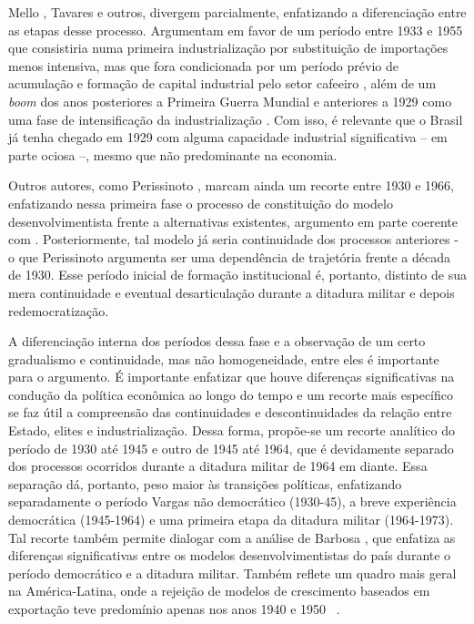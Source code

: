 Mello \citeyearpar{mello1982}, Tavares \citeyearpar{tavares1973} e outros,
divergem parcialmente, enfatizando a diferenciação entre as
etapas desse processo. Argumentam em favor de um período entre 1933 e 1955 que
consistiria numa primeira industrialização por substituição de
importações menos intensiva, mas que fora condicionada por um período
prévio de acumulação e formação de capital industrial pelo setor
cafeeiro \citep{mello1982}, além de um \emph{boom} dos anos posteriores
a Primeira Guerra Mundial e anteriores a 1929 como uma fase de intensificação da
industrialização \citep{suzigan2000}. Com isso, é relevante que o Brasil já tenha
chegado em 1929 com alguma capacidade industrial significativa -- em parte
ociosa --, mesmo que não predominante na economia.

Outros autores, como Perissinoto \citeyearpar{perissinotto_ideias_2023},
marcam ainda um recorte entre 1930 e 1966,
enfatizando nessa primeira fase o processo de constituição do
modelo desenvolvimentista frente a alternativas existentes, argumento
em parte coerente com \citep{bielschowsky_estrategia_2012}. Posteriormente,
 tal modelo já seria continuidade dos processos
anteriores - o que Perissinoto \citeyearpar{perissinotto_ideias_2023}
argumenta ser uma dependência de 
trajetória frente a década de 1930. Esse período inicial de formação
institucional é, portanto, distinto de sua mera continuidade e eventual
desarticulação durante a ditadura militar e depois redemocratização.

A diferenciação interna dos períodos dessa fase e a observação de um
certo gradualismo e continuidade, mas não homogeneidade, entre eles é
importante para o argumento. É importante enfatizar que houve diferenças
significativas na condução da política econômica ao longo do tempo e
um recorte mais específico se faz útil a compreensão das continuidades e
descontinuidades da relação entre Estado, elites e
industrialização. Dessa forma, propõe-se um recorte analítico do período
de 1930 até 1945 e outro de 1945 até 1964, que é devidamente separado
dos processos ocorridos durante a ditadura militar de 1964 em diante.
Essa separação dá, portanto, peso maior às transições políticas,
enfatizando separadamente o período Vargas não democrático (1930-45), a
breve experiência democrática (1945-1964) e uma primeira etapa da
ditadura militar (1964-1973). Tal recorte também permite dialogar com a
análise de Barbosa \citeyearpar{barbosa_developmentalist_2020},
que enfatiza as diferenças significativas
entre os modelos desenvolvimentistas do país durante o período
democrático e a ditadura militar. Também reflete um quadro mais geral na
América-Latina, onde a rejeição de modelos de crescimento baseados em
exportação teve predomínio apenas nos anos 1940 e 1950 
~\citep{bethell_cambridge_2009,bethell_cambridge_2009-1}.

